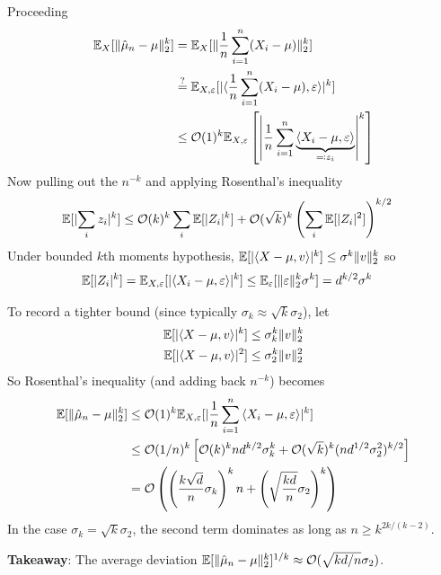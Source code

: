 Proceeding
\begin{align}
  \mathbb{E}_X [ \|\hat{\mu}_n - \mu\|_2^k ]
  &= \mathbb{E}_X [ \| \frac{1}{n} \sum_{i=1}^n (X_i - \mu)\|_2^k ] \\
  &\overset{?}{=} \mathbb{E}_{X,\varepsilon} [ \lvert \braket{\frac{1}{n} \sum_{i=1}^n (X_i - \mu), \varepsilon} \rvert^k ] \\
  &\leq \mathcal{O}(1)^k \mathbb{E}_{X, \varepsilon}\left[
    \left\lvert
      \frac{1}{n} \sum^{n}_{i=1} \underbrace{\braket{X_i - \mu, \varepsilon}}_{\eqqcolon z_i}
    \right\rvert^k
  \right]
\end{align}
Now pulling out the $n^{-k}$ and applying Rosenthal's inequality
\begin{align}
  \mathbb{E}[\lvert \sum_i z_i \rvert^k]
  &\leq \mathcal{O}(k)^k \sum_i \mathbb{E}[\lvert Z_i \rvert^k]
  + \mathcal{O}(\sqrt{k})^k \left(\sum_i \mathbb{E}[\lvert Z_i \rvert^2]\right)^{k/2}
\end{align}
Under bounded $k$th moments hypothesis, $\mathbb{E}[\lvert \braket{X - \mu,
v}\rvert^k] \leq \sigma^k \|v\|_2^k$ so
\begin{align}
  \mathbb{E}[\lvert Z_i \rvert^k]
  &= \mathbb{E}_{X,\varepsilon}[\lvert \braket{X_i - \mu, \varepsilon}\rvert^k]
  \leq \mathbb{E}_\varepsilon[\|\varepsilon\|_2^k \sigma^k]
  = d^{k/2} \sigma^k
\end{align}

To record a tighter bound (since typically $\sigma_k \approx \sqrt{k} \sigma_2$),
let
\begin{align}
  \mathbb{E}[\lvert \braket{X - \mu, v}\rvert^k]
  &\leq \sigma_k^k \|v\|_2^k \\
  \mathbb{E}[\lvert \braket{X - \mu, v}\rvert^2]
  &\leq \sigma_2^k \|v\|_2^2
\end{align}
So Rosenthal's inequality (and adding back $n^{-k}$) becomes
\begin{align}
  \mathbb{E}[\|\hat{\mu}_n - \mu\|_2^k]
  &\leq \mathcal{O}(1)^k \mathbb{E}_{X, \varepsilon}[\lvert \frac{1}{n} \sum^{n}_{i=1} \braket{X_i - \mu, \varepsilon}\rvert^k] \\
  &\leq \mathcal{O}(1/n)^k \left[
    \mathcal{O}(k)^k n d^{k/2} \sigma_k^k + \mathcal{O}(\sqrt{k})^k (n d^{1/2} \sigma_2^2)^{k/2}
  \right] \\
  &= \mathcal{O}\left(
    \left( \frac{k \sqrt{d}}{n} \sigma_k\right)^k n
    + \left(\sqrt{\frac{k d}{n}}\sigma_2 \right)^k
  \right)
\end{align}
In the case $\sigma_k = \sqrt{k} \sigma_2$, the second term dominates as long
as $n \geq k^{2k / (k-2)}$.

\textbf{Takeaway}: The average deviation $\mathbb{E}[\|\hat{\mu}_n - \mu\|_2^k]^{1/k} \approx \mathcal{O}(\sqrt{k d / n} \sigma_2)$.


